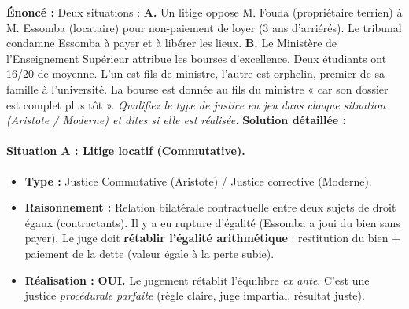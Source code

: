 \documentclass[11pt]{article}
\newcommand{\cle}[1]{{\popxbold\color{popdark}#1}}
\begin{document}
\begin{exoresolu}
    \textbf{Énoncé :} Deux situations : 
    \textbf{A.} Un litige oppose M. Fouda (propriétaire terrien) à M. Essomba (locataire) pour non-paiement de loyer (3 ans d'arriérés). Le tribunal condamne Essomba à payer et à libérer les lieux. 
    \textbf{B.} Le Ministère de l'Enseignement Supérieur attribue les bourses d'excellence. Deux étudiants ont 16/20 de moyenne. L'un est fils de ministre, l'autre est orphelin, premier de sa famille à l'université. La bourse est donnée au fils du ministre « car son dossier est complet plus tôt ».
    \textit{Qualifiez le type de justice en jeu dans chaque situation (Aristote / Moderne) et dites si elle est réalisée.}
    \tcblower
    \textbf{Solution détaillée :}
    \paragraph{Situation A : Litige locatif (Commutative).}
    \begin{itemize}
        \item \textbf{Type :} \cle{Justice Commutative} (Aristote) / \cle{Justice corrective} (Moderne).
        \item \textbf{Raisonnement :} Relation bilatérale contractuelle entre deux sujets de droit égaux (contractants). Il y a eu rupture d'égalité (Essomba a joui du bien sans payer). Le juge doit \textbf{rétablir l'égalité arithmétique} : restitution du bien + paiement de la dette (valeur égale à la perte subie).
        \item \textbf{Réalisation :} \textbf{OUI.} Le jugement rétablit l'équilibre \emph{ex ante}. C'est une justice \emph{procédurale parfaite} (règle claire, juge impartial, résultat juste).
    \end{itemize}

\end{exoresolu}
\end{document}
